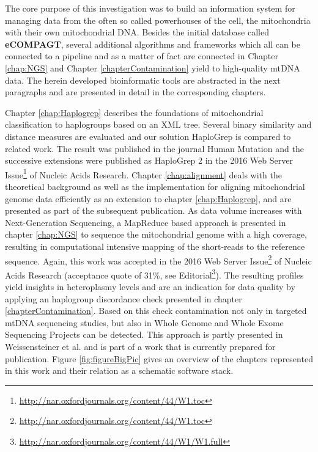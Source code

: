 The core purpose of this investigation was to build an information system for managing data from the often so called powerhouses of the cell, the mitochondria with their own mitochondrial DNA. Besides the initial database called \textbf{eCOMPAGT}, several additional algorithms and frameworks which all can be connected to a pipeline and as a matter of fact are connected in Chapter \ref{chap:NGS} and Chapter \ref{chapterContamination} yield to high-quality mtDNA data. The herein developed bioinformatic tools are abstracted in the next paragraphs and are presented in detail in the corresponding chapters.

Chapter \ref{chap:Haplogrep} describes the foundations of mitochondrial classification to haplogroups based on an XML tree. Several binary similarity and distance measures are evaluated and our solution HaploGrep is compared to related work. The result was published in the journal Human Mutation \cite{Kloss-Brandstatter2011} and the successive extensions were published as HaploGrep 2 in the 2016 Web Server Issue\footnote{\url{http://nar.oxfordjournals.org/content/44/W1.toc}} of Nucleic Acids Research\cite{Weissensteiner2016a}. Chapter \ref{chap:alignment} deals with the theoretical background as well as the implementation for aligning mitochondrial genome data efficiently as an extension to chapter \ref{chap:Haplogrep}, and are presented as part of the subsequent publication. As data volume increases with Next-Generation Sequencing, a MapReduce based approach is presented in chapter \ref{chap:NGS} to sequence the mitochondrial genome with a high coverage, resulting in computational intensive mapping of the short-reads to the reference sequence. Again, this work was accepted in the 2016 Web Server Issue\footnote{\url{http://nar.oxfordjournals.org/content/44/W1.toc}} of Nucleic Acids Research\cite{Weissensteiner2016b} (acceptance quote of 31\%, see Editorial\footnote{\url{http://nar.oxfordjournals.org/content/44/W1/W1.full}}). The resulting profiles yield insights in heteroplasmy levels and are an indication for data quality by applying an haplogroup discordance check presented in chapter \ref{chapterContamination}. Based on this check contamination not only in targeted mtDNA sequencing studies, but also in Whole Genome and Whole Exome Sequencing Projects can be detected. This approach is partly presented in Weissensteiner et al. \cite{Weissensteiner2016b} and is part of a work that is currently prepared for publication. Figure \ref{fig:figureBigPic} gives an overview of the chapters represented in this work and their relation as a schematic software stack.
  
